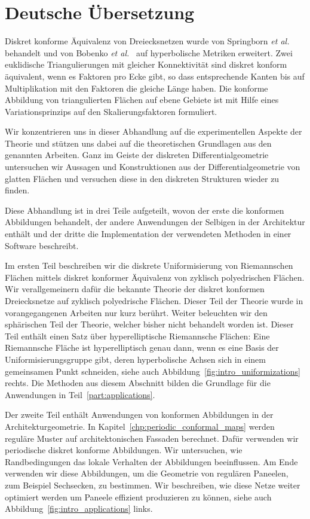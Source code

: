 \documentclass[Thesis.tex]{subfiles}
\begin{document}
\section*{Deutsche \"{U}bersetzung}
Diskret konforme \"{A}quivalenz von Dreiecksnetzen wurde von Springborn {\it et al.}~\cite{Springborn2008} behandelt und von Bobenko {\it et al.}~\cite{BPS2015:dconf} auf hyperbolische Metriken erweitert.
Zwei euklidische Triangulierungen mit gleicher Konnektivit\"{a}t sind diskret konform \"{a}quivalent, wenn es  Faktoren pro Ecke gibt, so dass entsprechende Kanten bis auf Multiplikation mit den Faktoren die gleiche L\"{a}nge haben.
Die konforme Abbildung von triangulierten Fl\"{a}chen auf ebene Gebiete ist mit Hilfe eines Variationsprinzips auf den Skalierungsfaktoren formuliert.

Wir konzentrieren uns in dieser Abhandlung auf die experimentellen Aspekte der Theorie und st\"{u}tzen uns dabei auf die theoretischen Grundlagen aus den genannten Arbeiten.
Ganz im Geiste der diskreten Differentialgeometrie untersuchen wir Aussagen und Konstruktionen aus der Differentialgeometrie von glatten Fl\"{a}chen und versuchen diese in den diskreten Strukturen wieder zu finden.

Diese Abhandlung ist in drei Teile aufgeteilt, wovon der erste die konformen Abbildungen behandelt, der andere Anwendungen der Selbigen in der Architektur enth\"{a}lt und der dritte die Implementation der verwendeten Methoden in einer Software beschreibt.

Im ersten Teil beschreiben wir die diskrete Uniformisierung von Riemannschen Fl\"{a}chen mittels diskret konformer \"{A}quivalenz von zyklisch polyedrischen Fl\"{a}chen.
Wir verallgemeinern daf\"{u}r die bekannte Theorie der diskret konformen Dreiecksnetze auf zyklisch polyedrische Fl\"{a}chen.
Dieser Teil der Theorie wurde in vorangegangenen Arbeiten nur kurz ber\"{u}hrt.
Weiter beleuchten wir den sph\"{a}rischen Teil der Theorie, welcher bisher nicht behandelt worden ist.
Dieser Teil enth\"{a}lt einen Satz \"{u}ber hyperelliptische Riemannsche Fl\"{a}chen: 
Eine Riemannsche Fl\"{a}che ist hyperelliptisch genau dann, wenn es eine Basis der Uniformisierungsgruppe gibt, deren hyperbolische Achsen sich in einem gemeinsamen Punkt schneiden, siehe auch Abbildung~\ref{fig:intro_uniformizations} rechts.
Die Methoden aus diesem Abschnitt bilden die Grundlage f\"{u}r die Anwendungen in Teil~\ref{part:applications}.

Der zweite Teil enth\"{a}lt Anwendungen von konformen Abbildungen in der Architekturgeometrie.
In Kapitel~\ref{chp:periodic_conformal_maps} werden regul\"{a}re Muster auf architektonischen Fassaden berechnet.
Daf\"{u}r verwenden wir periodische diskret konforme Abbildungen.
Wir untersuchen, wie Randbedingungen das lokale Verhalten der Abbildungen beeinflussen.
Am Ende verwenden wir diese Abbildungen, um die Geometrie von regul\"{a}ren Paneelen, zum Beispiel Sechsecken, zu bestimmen. 
Wir beschreiben, wie diese Netze weiter optimiert werden um Paneele effizient produzieren zu k\"{o}nnen, siehe auch Abbildung~\ref{fig:intro_applications} links.
\end{document}
